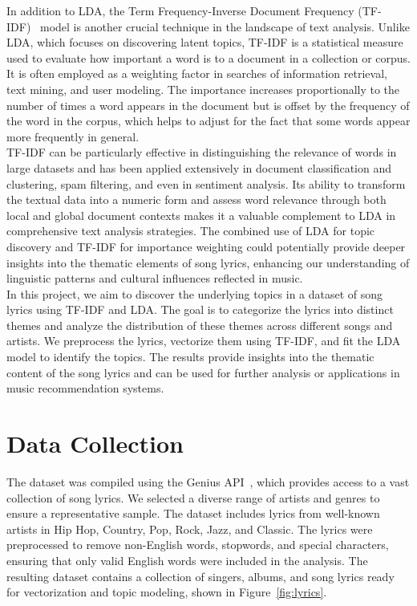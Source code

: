 \documentclass{article}
\begin{document}
\noindent In addition to LDA, the Term Frequency-Inverse Document Frequency (TF-IDF)~\cite{sparck1972statistical} model is another crucial technique in the landscape of text analysis. Unlike LDA, which focuses on discovering latent topics, TF-IDF is a statistical measure used to evaluate how important a word is to a document in a collection or corpus. It is often employed as a weighting factor in searches of information retrieval, text mining, and user modeling. The importance increases proportionally to the number of times a word appears in the document but is offset by the frequency of the word in the corpus, which helps to adjust for the fact that some words appear more frequently in general.\\

\noindent TF-IDF can be particularly effective in distinguishing the relevance of words in large datasets and has been applied extensively in document classification and clustering, spam filtering, and even in sentiment analysis. Its ability to transform the textual data into a numeric form and assess word relevance through both local and global document contexts makes it a valuable complement to LDA in comprehensive text analysis strategies. The combined use of LDA for topic discovery and TF-IDF for importance weighting could potentially provide deeper insights into the thematic elements of song lyrics, enhancing our understanding of linguistic patterns and cultural influences reflected in music.\\

\noindent In this project, we aim to discover the underlying topics in a dataset of song lyrics using TF-IDF and LDA. The goal is to categorize the lyrics into distinct themes and analyze the distribution of these themes across different songs and artists. We preprocess the lyrics, vectorize them using TF-IDF, and fit the LDA model to identify the topics. The results provide insights into the thematic content of the song lyrics and can be used for further analysis or applications in music recommendation systems.



\section{Data Collection}

The dataset was compiled using the Genius API~\cite{geniusapi}, which provides access to a vast collection of song lyrics. We selected a diverse range of artists and genres to ensure a representative sample. The dataset includes lyrics from well-known artists in Hip Hop, Country, Pop, Rock, Jazz, and Classic. The lyrics were preprocessed to remove non-English words, stopwords, and special characters, ensuring that only valid English words were included in the analysis. The resulting dataset contains a collection of singers, albums, and song lyrics ready for vectorization and topic modeling, shown in Figure~\ref{fig:lyrics}.
\end{document}
